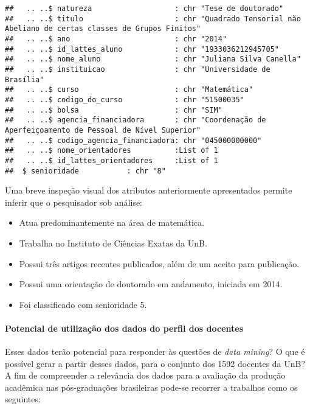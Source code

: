 \documentclass[]{article}
\providecommand{\tightlist}{%
  \setlength{\itemsep}{0pt}\setlength{\parskip}{0pt}}
\let\oldparagraph\paragraph
\renewcommand{\paragraph}[1]{\oldparagraph{#1}\mbox{}}
\begin{document}
\begin{verbatim}
##   .. ..$ natureza                   : chr "Tese de doutorado"
##   .. ..$ titulo                     : chr "Quadrado Tensorial não Abeliano de certas classes de Grupos Finitos"
##   .. ..$ ano                        : chr "2014"
##   .. ..$ id_lattes_aluno            : chr "1933036212945705"
##   .. ..$ nome_aluno                 : chr "Juliana Silva Canella"
##   .. ..$ instituicao                : chr "Universidade de Brasília"
##   .. ..$ curso                      : chr "Matemática"
##   .. ..$ codigo_do_curso            : chr "51500035"
##   .. ..$ bolsa                      : chr "SIM"
##   .. ..$ agencia_financiadora       : chr "Coordenação de Aperfeiçoamento de Pessoal de Nível Superior"
##   .. ..$ codigo_agencia_financiadora: chr "045000000000"
##   .. ..$ nome_orientadores          :List of 1
##   .. ..$ id_lattes_orientadores     :List of 1
##  $ senioridade           : chr "8"
\end{verbatim}

Uma breve inspeção visual dos atributos anteriormente apresentados
permite inferir que o pesquisador sob análise:

\begin{itemize}
\tightlist
\item
  Atua predominantemente na área de matemática.
\item
  Trabalha no Instituto de Ciências Exatas da UnB.
\item
  Possui três artigos recentes publicados, além de um aceito para
  publicação.
\item
  Possui uma orientação de doutorado em andamento, iniciada em 2014.
\item
  Foi classificado com senioridade 5.
\end{itemize}

\paragraph{Potencial de utilização dos dados do perfil dos
docentes}\label{potencial-de-utilizacao-dos-dados-do-perfil-dos-docentes}

Esses dados terão potencial para responder às questões de \emph{data
mining}? O que é possível gerar a partir desses dados, para o conjunto
dos 1592 docentes da UnB? A fim de compreender a relevância dos dados
para a avaliação da produção acadêmica nas pós-graduações brasileiras
pode-se recorrer a trabalhos como os seguintes:
\end{document}
